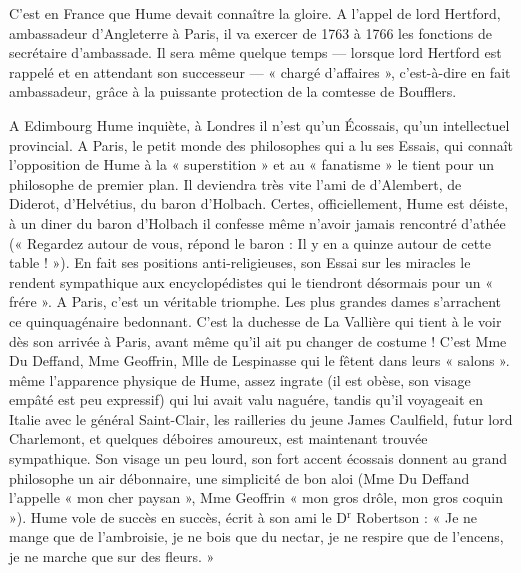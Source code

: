 C’est en France que Hume devait connaître la
gloire. A l’appel de lord Hertford, ambassadeur
d’Angleterre à Paris, il va exercer de 1763 à 1766
les fonctions de secrétaire d’ambassade. Il sera
même quelque temps — lorsque lord Hertford
est rappelé et en attendant son successeur — « chargé
d’affaires », c’est-à-dire en fait ambassadeur, grâce
à la puissante protection de la comtesse de Boufflers.

A Edimbourg Hume inquiète, à Londres il n’est
qu’un Écossais, qu’un intellectuel provincial. A
Paris, le petit monde des philosophes qui a lu ses
Essais, qui connaît l’opposition de Hume à la
« superstition » et au « fanatisme » le tient pour un
philosophe de premier plan. Il deviendra très vite
l'ami de d’Alembert, de Diderot, d’Helvétius, du
baron d’Holbach. Certes, officiellement, Hume est
déiste, à un diner du baron d’Holbach il confesse
même n’avoir jamais rencontré d’athée (« Regardez
autour de vous, répond le baron : Il y en a quinze
autour de cette table ! »). En fait ses positions anti-religieuses,
son Essai sur les miracles le rendent
sympathique aux encyclopédistes qui le tiendront
désormais pour un « frére ». A Paris, c’est un véritable
triomphe. Les plus grandes dames s’arrachent ce
quinquagénaire bedonnant. C’est la duchesse de
La Vallière qui tient à le voir dès son arrivée à Paris,
avant même qu’il ait pu changer de costume !
C’est Mme Du Deffand, Mme Geoffrin, Mlle de Lespinasse
qui le fêtent dans leurs « salons ». même
l'apparence physique de Hume, assez ingrate (il
est obèse, son visage empâté est peu expressif)
qui lui avait valu naguére, tandis qu’il voyageait
en Italie avec le général Saint-Clair, les railleries
du jeune James Caulfield, futur lord Charlemont,
et quelques déboires amoureux, est maintenant
trouvée sympathique. Son visage un peu lourd, son
fort accent écossais donnent au grand philosophe
un air débonnaire, une simplicité de bon aloi
(Mme Du Deffand l'appelle « mon cher paysan »,
Mme Geoffrin « mon gros drôle, mon gros coquin »).
Hume vole de succès en succès, écrit à son ami le
D$^\text{r}$ Robertson : « Je ne mange que de l’ambroisie,
je ne bois que du nectar, je ne respire que de l’encens,
je ne marche que sur des fleurs. »

